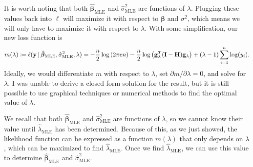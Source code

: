 \documentclass[10pt]{article}
\begin{document}
\begin{itemize}
    It is worth noting that both \(\hat{\bm{\beta}}_{\mathrm{MLE}}\) and \(\hat{\sigma}^2_{\mathrm{MLE}}\) are functions of \(\lambda\). 
    Plugging these values back into \(\ell\) will maximize it with respect to \(\bm{\beta}\) and \(\sigma^2\), 
    which means we will only have to maximize it with respect to \(\lambda\). 
    With some simplification, our new loss function is 
    \begin{align*}
        m(\lambda)
        \coloneqq \ell(\mathbf{y} \,|\, \hat{\bm{\beta}}_{\mathrm{MLE}}, \hat{\sigma}^2_{\mathrm{MLE}}, \lambda)
        = - \frac{n}{2} \log \left( 2 \pi \mathrm{e} n \right) - \frac{n}{2} \log \big( \mathbf{g}_{\lambda}^T(\mathbf{I} - \mathbf{H}) \mathbf{g}_{\lambda} \big) + (\lambda - 1) \sum_{i=1}^n \log(y_i).
    \end{align*}
    Ideally, we would differentiate \(m\) with respect to \(\lambda\), set \(\partial m / \partial \lambda = 0\), and solve for \(\lambda\). I was unable to 
    derive a closed form solution for the result, but it is still possible to use graphical techniques or numerical methods to find the optimal value of \(\lambda\). 

    We recall that both \(\hat{\bm{\beta}}_{\mathrm{MLE}}\) and \(\hat{\sigma}^2_{\mathrm{MLE}}\) are functions of \(\lambda\), so we cannot know their value until \(\hat{\lambda}_{\mathrm{MLE}}\) has been determined.
    Because of this, as we just showed, the likelihood function can be expressed as a function \(m(\lambda)\) that only depends on \(\lambda\), which can be maximized to find \(\hat{\lambda}_{\mathrm{MLE}}\). 
    Once we find \(\hat{\lambda}_{\mathrm{MLE}}\), we can use this value to determine \(\hat{\bm{\beta}}_{\mathrm{MLE}}\) and \(\hat{\sigma}^2_{\mathrm{MLE}}\). 



\end{itemize}
\end{document}
